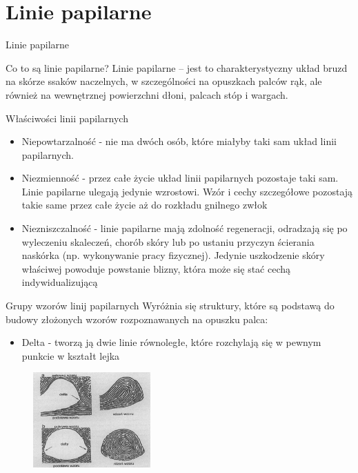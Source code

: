 \documentclass{beamer}
\begin{document}
\section{Linie papilarne}

\begin{frame}
    \centering
    \huge
    Linie papilarne
\end{frame}

\begin{frame}{Co to są linie papilarne?}
    Linie papilarne – jest to charakterystyczny układ bruzd na skórze ssaków naczelnych, w szczególności na opuszkach palców rąk, ale również na wewnętrznej powierzchni dłoni, palcach stóp i wargach.
\end{frame}

\begin{frame}{Właściwości linii papilarnych}
    \begin{itemize}
        \item{Niepowtarzalność - nie ma dwóch osób, które miałyby taki sam układ linii papilarnych.}
        \item{Niezmienność - przez całe życie układ linii papilarnych pozostaje taki sam. Linie papilarne ulegają jedynie wzrostowi. Wzór i cechy szczegółowe pozostają takie same przez całe życie aż do rozkładu gnilnego zwłok}
        \item{Niezniszczalność - linie papilarne mają zdolność regeneracji, odradzają się po wyleczeniu skaleczeń, chorób skóry lub po ustaniu przyczyn ścierania naskórka (np. wykonywanie pracy fizycznej). Jedynie uszkodzenie skóry właściwej powoduje powstanie blizny, która może się stać cechą indywidualizującą}
    \end{itemize}
\end{frame}

\begin{frame}{Grupy wzorów linij papilarnych}
    Wyróżnia się struktury, które są podstawą do budowy złożonych wzorów rozpoznawanych na opuszku palca:
    \begin{itemize}
        \item{Delta - tworzą ją dwie linie równoległe, które rozchylają się w pewnym punkcie w kształt lejka}
    \end{itemize}
    \begin{figure}[t]
        \centering
        \includegraphics[width=0.4\textwidth]{fingerprints/delta.png}
    \end{figure}
\end{frame}
\end{document}
